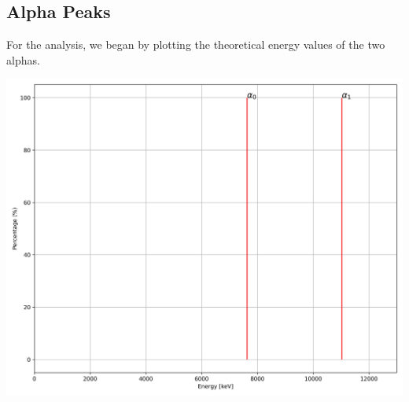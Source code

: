 \documentclass{article}
\begin{document}
\begin{multicols}{2}
%
%
%
%
%
%

\section{Alpha Peaks}
    \label{sec:alphapeaks}

For the analysis, we began by plotting the theoretical energy values of the two alphas.

\begin{center}
    \label{alfa_peaks}
    \centering
    \includegraphics[scale = 0.28]{../../images/AlphaPeaks.jpeg}
\end{center}


\end{multicols}
\end{document}
